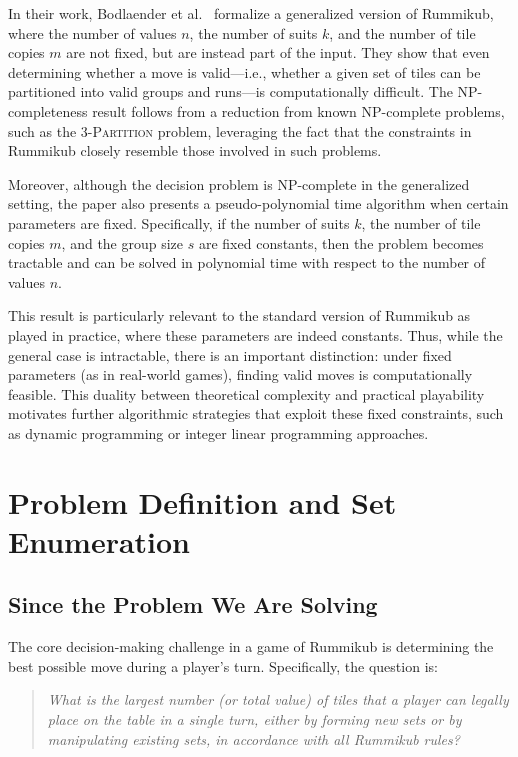 \documentclass[11pt,letterpaper]{article}
\begin{document}
In their work, Bodlaender et al.~\cite{rummikub_complexity} formalize a generalized version of Rummikub, where the number of values $n$, the number of suits $k$, and the number of tile copies $m$ are not fixed, but are instead part of the input. They show that even determining whether a move is valid—i.e., whether a given set of tiles can be partitioned into valid groups and runs—is computationally difficult. The NP-completeness result follows from a reduction from known NP-complete problems, such as the \textsc{3-Partition} problem, leveraging the fact that the constraints in Rummikub closely resemble those involved in such problems.

Moreover, although the decision problem is NP-complete in the generalized setting, the paper also presents a pseudo-polynomial time algorithm when certain parameters are fixed. Specifically, if the number of suits $k$, the number of tile copies $m$, and the group size $s$ are fixed constants, then the problem becomes tractable and can be solved in polynomial time with respect to the number of values $n$. 

This result is particularly relevant to the standard version of Rummikub as played in practice, where these parameters are indeed constants. Thus, while the general case is intractable, there is an important distinction: under fixed parameters (as in real-world games), finding valid moves is computationally feasible. This duality between theoretical complexity and practical playability motivates further algorithmic strategies that exploit these fixed constraints, such as dynamic programming or integer linear programming approaches.


\section*{Problem Definition and Set Enumeration}

\subsection*{Since the Problem We Are Solving}

The core decision-making challenge in a game of Rummikub is determining the best possible move during a player's turn. Specifically, the question is:

\begin{quote}
    \emph{What is the largest number (or total value) of tiles that a player can legally place on the table in a single turn, either by forming new sets or by manipulating existing sets, in accordance with all Rummikub rules?}
\end{quote}
\end{document}

